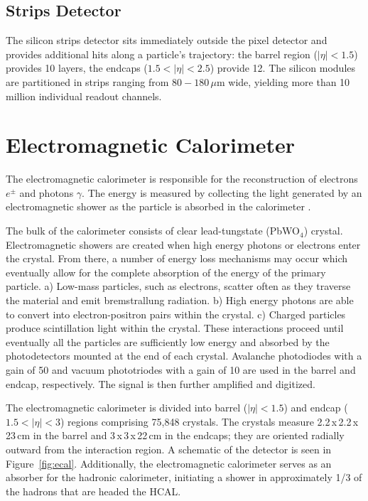 \subsection{Strips Detector}

The silicon strips detector sits immediately outside the pixel detector and provides additional hits along a particle's trajectory: the barrel region ($|\eta|<1.5$) provides 10 layers, the endcaps ($1.5<|\eta|<2.5$) provide 12. The silicon modules are partitioned in strips ranging from $80-180\,\mu$m wide, yielding more than 10 million individual readout channels.

\section{Electromagnetic Calorimeter}

The electromagnetic calorimeter is responsible for the reconstruction of electrons $e^{\pm}$ and photons $\gamma$. The energy is measured by collecting the light generated by an electromagnetic shower as the particle is absorbed in the calorimeter \cite{ecaltdr, ecaltdradd}.

The bulk of the calorimeter consists of clear lead-tungstate (PbWO$_{4}$) crystal. Electromagnetic showers are created when high energy photons or electrons enter the crystal. From there, a number of energy loss mechanisms may occur which eventually allow for the complete absorption of the energy of the primary particle. a) Low-mass particles, such as electrons, scatter often as they traverse the material and emit bremstrallung radiation. b) High energy photons are able to convert into electron-positron pairs within the crystal. c) Charged particles produce scintillation light within the crystal. These interactions proceed until eventually all the particles are sufficiently low energy and absorbed by the photodetectors mounted at the end of each crystal. Avalanche photodiodes with a gain of 50 and vacuum phototriodes with a gain of 10 are used in the barrel and endcap, respectively. The signal is then further amplified and digitized.

The electromagnetic calorimeter is divided into barrel ($|\eta|<1.5$) and endcap ($1.5<|\eta|<3$) regions comprising 75,848 crystals. The crystals measure 2.2$\,$x$\,$2.2$\,$x$\,$23$\,$cm in the barrel and 3$\,$x$\,$3$\,$x$\,$22$\,$cm in the endcaps; they are oriented radially outward from the interaction region. A schematic of the detector is seen in Figure~\ref{fig:ecal}. Additionally, the electromagnetic calorimeter serves as an absorber for the hadronic calorimeter, initiating a shower in approximately 1/3 of the hadrons that are headed the HCAL.

